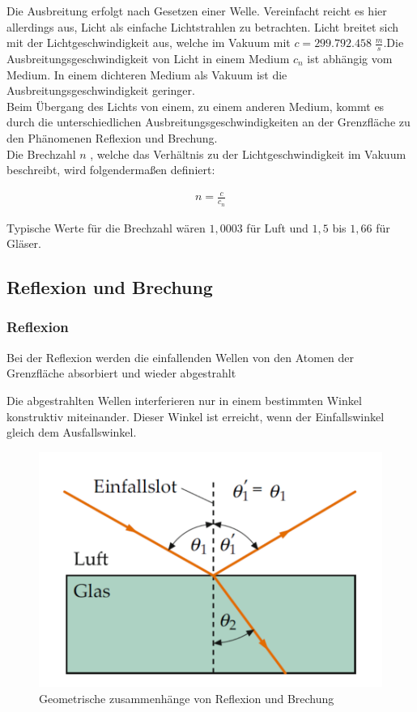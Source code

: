 \documentclass[a4paper]{scrartcl}
\numberwithin{equation}{subsection}
\begin{document}

Die Ausbreitung erfolgt nach Gesetzen einer Welle. Vereinfacht reicht es hier allerdings aus, Licht als einfache Lichtstrahlen zu betrachten. Licht breitet sich mit der Lichtgeschwindigkeit aus, welche im Vakuum mit $c = 299.792.458 \;\frac{m}{s}$.Die Ausbreitungsgeschwindigkeit von Licht in einem Medium $c_n$ ist abhängig vom Medium. In einem dichteren Medium als Vakuum ist die Ausbreitungsgeschwindigkeit geringer. \cite{phys} \\

Beim Übergang des Lichts von einem, zu einem anderen Medium, kommt es durch die unterschiedlichen Ausbreitungsgeschwindigkeiten an der Grenzfläche zu den Phänomenen Reflexion und Brechung. \\

Die Brechzahl $n$ , welche das Verhältnis zu der Lichtgeschwindigkeit im Vakuum beschreibt, wird folgendermaßen definiert\cite{phys}:

\begin{align}
n = \frac{c}{c_n}
\end{align}

Typische Werte für die Brechzahl wären $1,0003$ für Luft und $1,5$ bis $1,66$ für Gläser. \cite{phys}

\subsection{Reflexion und Brechung}
\subsubsection{Reflexion}

Bei der Reflexion werden die einfallenden Wellen von den Atomen der Grenzfläche absorbiert und wieder abgestrahlt

Die abgestrahlten Wellen interferieren nur in einem bestimmten Winkel konstruktiv miteinander. Dieser Winkel ist erreicht, wenn der Einfallswinkel gleich dem Ausfallswinkel.

\begin{figure}[H]
\includegraphics[width=12cm]{Abbildungen/reflexion_und_brechung}
\centering
\caption{Geometrische zusammenhänge von Reflexion und Brechung \cite{phys}}
\centering
\label{fig:reflexion_und_brechung}
\end{figure}
\end{document}
